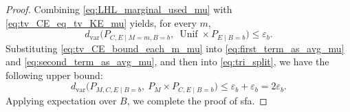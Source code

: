 \documentclass[onecolumn]{IEEEtran} %
\newcommand{\1}{\mathbbm{1}}
\theoremstyle{boldremark}
\DeclareMathOperator{\Unif}{Unif}
\newcommand{\pperp}{\mathrel{\perp\!\!\!\perp}}
\begin{document}
\begin{proof}
Combining \eqref{eq:LHL_marginal_used_mu} with \eqref{eq:tv_CE_eq_tv_KE_mu} yields, for every $m$,
\begin{equation}\label{eq:tv_CE_bound_each_m_mu}
d_{\mathrm{var}}\!\big(P_{C,E\mid M=m,B=b},\ \Unif\times P_{E\mid B=b}\big)\le \varepsilon_b.
\end{equation}
Substituting \eqref{eq:tv_CE_bound_each_m_mu} into \eqref{eq:first_term_as_avg_mu} and \eqref{eq:second_term_as_avg_mu},
and then into \eqref{eq:tri_split}, we have the following upper bound:
\[
d_{\mathrm{var}}\!\big(P_{M,C,E\mid B=b},\ P_M\times P_{C,E\mid B=b}\big)\le \varepsilon_b+\varepsilon_b=2\varepsilon_b.
\]
Applying expectation over $B$, we complete the proof of \gls{sfa}.









\end{proof}
\end{document}
